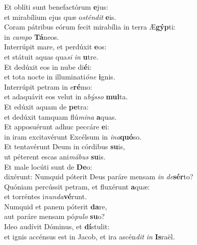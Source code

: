\evenverse Et oblíti sunt benefactórum \textbf{e}jus:~\*\\
\evenverse et mirabílium ejus quæ o\textit{stén}\textit{dit} \textbf{e}is.\\
\oddverse Coram pátribus eórum fecit mirabília in terra Æ\textbf{gýp}ti:~\*\\
\oddverse in \textit{cam}\textit{po} \textbf{Tá}neos.\\
\evenverse Interrúpit mare, et perdúxit \textbf{e}os:~\*\\
\evenverse et státuit aquas qua\textit{si} \textit{in} \textbf{u}tre.\\
\oddverse Et dedúxit eos in nube di\textbf{é}i:~\*\\
\oddverse et tota nocte in illuminati\textit{ó}\textit{ne} \textbf{i}gnis.\\
\evenverse Interrúpit petram in e\textbf{ré}mo:~\*\\
\evenverse et adaquávit eos velut in a\textit{býs}\textit{so} \textbf{mul}ta.\\
\oddverse Et edúxit aquam de \textbf{pe}tra:~\*\\
\oddverse et dedúxit tamquam flú\textit{mi}\textit{na} \textbf{a}quas.\\
\evenverse Et apposuérunt adhuc peccáre \textbf{e}i:~\*\\
\evenverse in iram excitavérunt Excélsum in \textit{i}\textit{na}\textbf{quó}so.\\
\oddverse Et tentavérunt Deum in córdibus \textbf{su}is,~\*\\
\oddverse ut péterent escas ani\textit{má}\textit{bus} \textbf{su}is.\\
\evenverse Et male locúti sunt de \textbf{De}o:~\*\\
\evenverse dixérunt: Numquid póterit Deus paráre mensam \textit{in} \textit{de}\textbf{sér}to?\\
\oddverse Quóniam percússit petram, et fluxérunt \textbf{a}quæ:~\*\\
\oddverse et torréntes i\textit{nun}\textit{da}\textbf{vé}runt.\\
\evenverse Numquid et panem póterit \textbf{da}re,~\*\\
\evenverse aut paráre mensam pó\textit{pu}\textit{lo} \textbf{su}o?\\
\oddverse Ideo audívit Dóminus, et \textbf{dí}stulit:~\*\\
\oddverse et ignis accénsus est in Jacob, et ira ascén\textit{dit} \textit{in} \textbf{Is}raël.\\

